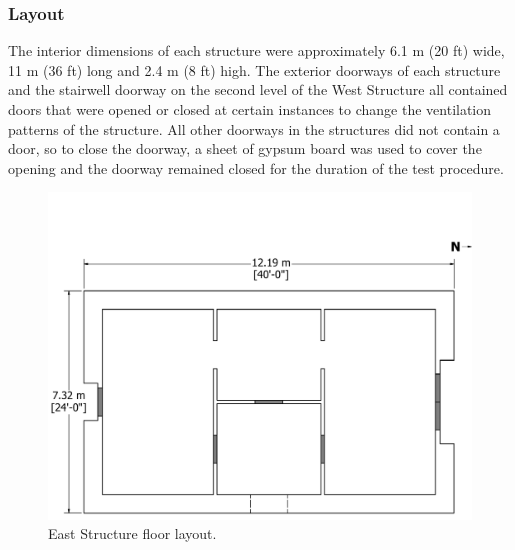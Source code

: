 \documentclass[12pt,oneside]{book}
\begin{document}
\clearpage

\subsubsection{Layout}
\label{subsubsec:layout}
The interior dimensions of each structure were approximately 6.1 m (20 ft) wide, 11 m (36 ft) long and 2.4 m (8 ft) high. The exterior doorways of each structure and the stairwell doorway on the second level of the West Structure all contained doors that were opened or closed at certain instances to change the ventilation patterns of the structure. All other doorways in the structures did not contain a door, so to close the doorway, a sheet of gypsum board was used to cover the opening and the doorway remained closed for the duration of the test procedure.

\begin{figure}[!ht]
\includegraphics[width=6in]{../Drawings/East_Test_Structure_Dimensioned}
\caption[Plan view of the East Structure.]{East Structure floor layout.}
\label{fig:east_general_plan}
\end{figure}
\FloatBarrier
\end{document}
